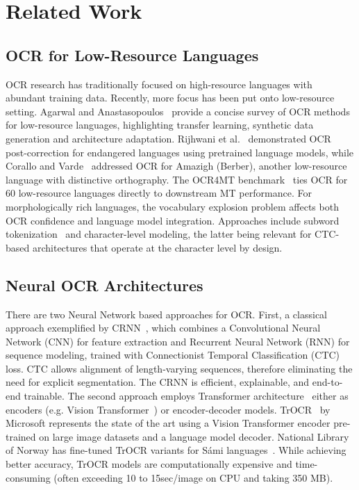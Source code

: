 \documentclass[conference]{IEEEtran}
\newcommand{\trocrSize}{350}
\newcommand{\inferencetime}{10 to 15}
\begin{document}
\section{Related Work}
\label{sec:related_work}

\subsection{OCR for Low-Resource Languages}
OCR research has traditionally focused on high-resource languages with abundant training data. Recently, more focus has been put onto low-resource setting. Agarwal and Anastasopoulos~\cite{agarwal2024ocr} provide a concise survey of OCR methods for low-resource languages, highlighting transfer learning, synthetic data generation and architecture adaptation. Rijhwani et al.~\cite{rijhwani2020} demonstrated OCR post-correction for endangered languages using pretrained language models, while Corallo and Varde~\cite{corallo2023} addressed OCR for Amazigh (Berber), another low-resource language with distinctive orthography. The OCR4MT benchmark~\cite{ignat2022ocr4mt} ties OCR for 60 low-resource languages directly to downstream MT performance.
For morphologically rich languages, the vocabulary explosion problem affects both OCR confidence and language model integration. Approaches include subword tokenization~\cite{sennrich2016bpe} and character-level modeling, the latter being relevant for CTC-based architectures that operate at the character level by design.

\subsection{Neural OCR Architectures}
\label{subsec:neural_ocr}
There are two Neural Network based approaches for OCR.
First, a classical approach exemplified by CRNN~\cite{shi2017crnn}, which combines a Convolutional Neural Network (CNN) for feature extraction and Recurrent Neural Network (RNN) for sequence modeling, trained with Connectionist Temporal Classification (CTC) loss. CTC allows alignment of length-varying sequences, therefore eliminating the need for explicit segmentation. The CRNN is efficient, explainable, and end-to-end trainable.  
The second approach employs Transformer architecture~\cite{vaswani2017attention} either as encoders (e.g. Vision Transformer~\cite{dosovitskiy2020vit}) or encoder-decoder models. 
TrOCR~\cite{li2023trocr} by Microsoft represents the state of the art using a Vision Transformer encoder pre-trained on large image datasets and a language model decoder. National Library of Norway has fine-tuned TrOCR variants for S\'{a}mi languages~\cite{enstad2025}. While achieving better accuracy, TrOCR models are computationally expensive and time-consuming (often exceeding \inferencetime  sec/image on CPU and taking \trocrSize{} MB).
\end{document}
